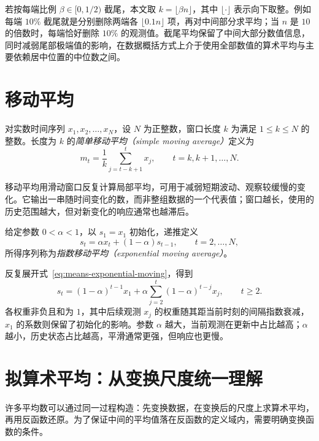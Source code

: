\documentclass[UTF8,12pt,a4paper,fontset=fandol]{ctexart}
\begin{document}
若按每端比例 $\beta\in[0,1/2)$ 截尾，本文取 $k=\lfloor\beta n\rfloor$，其中 $\lfloor\cdot\rfloor$ 表示向下取整。例如每端 $10\%$ 截尾就是分别删除两端各 $\lfloor0.1n\rfloor$ 项，再对中间部分求平均；当 $n$ 是 $10$ 的倍数时，每端恰好删除 $10\%$ 的观测值。截尾平均保留了中间大部分数值信息，同时减弱尾部极端值的影响，在数据概括方式上介于使用全部数值的算术平均与主要依赖居中位置的中位数之间。

\section{移动平均}
\label{sec:means-moving}

\begin{definition}
对实数时间序列 $x_1,x_2,\ldots,x_N$，设 $N$ 为正整数，窗口长度 $k$ 为满足 $1\le k\le N$ 的整数。长度为 $k$ 的\emph{简单移动平均（simple moving average）}定义为
\[
  m_t=\frac{1}{k}\sum_{j=t-k+1}^{t}x_j,
  \qquad t=k,k+1,\ldots,N.
\]
\end{definition}

移动平均用滑动窗口反复计算局部平均，可用于减弱短期波动、观察较缓慢的变化。它输出一串随时间变化的数，而非整组数据的一个代表值；窗口越长，使用的历史范围越大，但对新变化的响应通常也越滞后。

\begin{definition}
给定参数 $0<\alpha<1$，以 $s_1=x_1$ 初始化，递推定义
\begin{equation}
\label{eq:means-exponential-moving}
  s_t=\alpha x_t+(1-\alpha)s_{t-1},
  \qquad t=2,\ldots,N,
\end{equation}
所得序列称为\emph{指数移动平均（exponential moving average）}。
\end{definition}

反复展开式~\eqref{eq:means-exponential-moving}，得到
\[
  s_t=(1-\alpha)^{t-1}x_1
  +\alpha\sum_{j=2}^{t}(1-\alpha)^{t-j}x_j,
  \qquad t\ge2.
\]
各权重非负且和为 $1$，其中后续观测 $x_j$ 的权重随其距当前时刻的间隔指数衰减，$x_1$ 的系数则保留了初始化的影响。参数 $\alpha$ 越大，当前观测在更新中占比越高；$\alpha$ 越小，历史状态占比越高，平滑通常更强，但响应也更慢。

\section{拟算术平均：从变换尺度统一理解}
\label{sec:means-quasi-arithmetic}

许多平均数可以通过同一过程构造：先变换数据，在变换后的尺度上求算术平均，再用反函数还原。为了保证中间的平均值落在反函数的定义域内，需要明确变换函数的条件。
\end{document}
